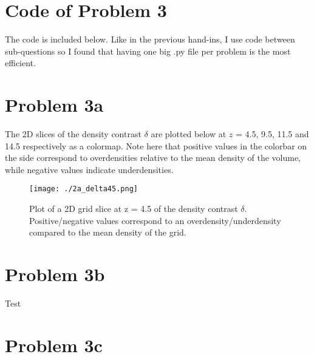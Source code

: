 \section*{Code of Problem 3}

The code is included below. Like in the previous hand-ins, I use code between sub-questions so I found that having one big .py file per problem is the most efficient.


\newpage

\section*{Problem 3a}

The 2D slices of the density contrast $\delta$ are plotted below at $z$ = 4.5, 9.5, 11.5 and 14.5 respectively as a colormap. Note here that positive values in the colorbar on the side correspond to overdensities relative to the mean density of the volume, while negative values indicate underdensities.

\begin{figure}[h!]
  \centering
  \texttt{[image: ./2a\_delta45.png]}
  \caption{Plot of a 2D grid slice at z = 4.5 of the density contrast $\delta$. Positive/negative values correspond to an overdensity/underdensity compared to the mean density of the grid.}
\end{figure}



\newpage

\section*{Problem 3b}

Test

\section*{Problem 3c}






